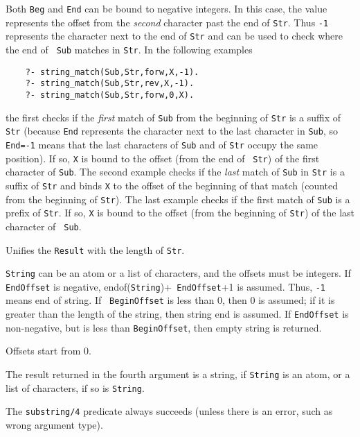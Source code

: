 \begin{description}
Both {\tt Beg} and {\tt End} can be bound to negative integers.
In this case, the value represents the offset from the \emph{second}
character past the end of {\tt Str}. Thus {\tt -1} represents the character
next to the end of {\tt Str} and can be used to check where the end of {\tt
  Sub}  matches in {\tt Str}. In the following examples
\begin{verbatim}
    ?- string_match(Sub,Str,forw,X,-1).  
    ?- string_match(Sub,Str,rev,X,-1).  
    ?- string_match(Sub,Str,forw,0,X).  
\end{verbatim}
the first checks if the \emph{first} match of {\tt Sub} from the beginning
of {\tt Str} is a suffix of {\tt Str} (because {\tt End} represents the
character next to the last character in {\tt Sub}, so {\tt End=-1} means
that the last characters of {\tt Sub} and of {\tt Str} occupy the same
position). If so, {\tt X} is bound to the offset (from the end of {\tt
  Str}) of the first character of {\tt Sub}. The second example checks if
the \emph{last} match of {\tt Sub} in {\tt Str} is a suffix of {\tt Str}
and binds {\tt X} to the offset of the beginning of that match (counted
from the beginning of {\tt Str}).  The last example checks if the first
match of {\tt Sub} is a prefix of {\tt Str}. If so, {\tt X} is bound to the
offset (from the beginning of {\tt Str}) of the last character of {\tt
  Sub}.



Unifies the {\tt Result}  with the length of {\tt Str}.

{\tt String} can be an atom or a list of characters, and the offsets must
be integers.  If {\tt EndOffset} is negative, endof({\tt String})+{\tt
  EndOffset}+1 is assumed. Thus, {\tt -1} means end of string.  If {\tt
  BeginOffset} is less than 0, then 0 is assumed; if it is greater than the
length of the string, then string end is assumed. If {\tt EndOffset} is
non-negative, but is less than {\tt BeginOffset}, then empty string is
returned.

Offsets start from 0.

The result returned in the fourth argument is a string, if {\tt String} is
an atom, or a list of characters, if so is {\tt String}.

The \verb|substring/4| predicate always succeeds (unless there is an error,
such as wrong argument type).


\end{description}
